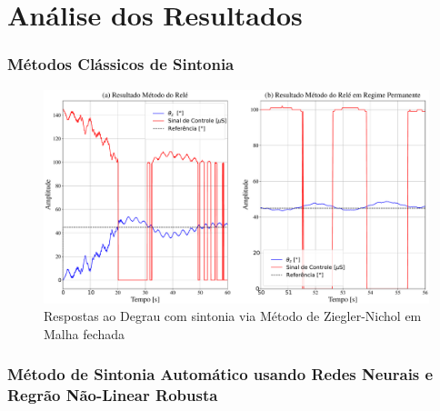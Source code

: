 \chapter{Análise dos Resultados}



\subsection{Métodos Clássicos de Sintonia}

\begin{figure}[H]
  \caption{Respostas ao Degrau com sintonia via Método de Ziegler-Nichol em Malha fechada}
  \begin{center}
      \includegraphics[scale=0.35]{resultados/img/relay}
  \end{center}
  \label{fig:mpu6050_analisys}
\end{figure}



\subsection{Método de Sintonia Automático usando Redes Neurais e Regrão Não-Linear Robusta}

